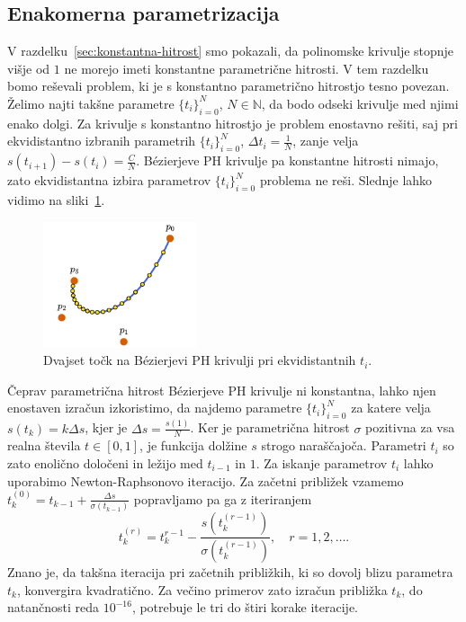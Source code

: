 \documentclass[isrm2, tisk]{fmfdelo}
\newcommand{\N}{\mathbb N}
\begin{document}
    \subsection{Enakomerna parametrizacija}
    V razdelku~\ref{sec:konstantna-hitrost} smo pokazali, da polinomske krivulje stopnje višje od $1$ ne morejo imeti konstantne parametrične hitrosti.
    V tem razdelku bomo reševali problem, ki je s konstantno parametrično hitrostjo tesno povezan.
    Želimo najti takšne parametre $\{t_i\}_{i=0}^{N}$, $N\in \N$, da bodo odseki krivulje med njimi enako dolgi.
    Za krivulje s konstantno hitrostjo je problem enostavno rešiti, saj pri ekvidistantno izbranih parametrih $\{t_i\}_{i=0}^{N}$, $\Delta t_i = \frac{1}{N}$, zanje velja $s(t_{i+1})-s(t_i) =\frac{C}{N}$.
    Bézierjeve PH krivulje pa konstantne hitrosti nimajo, zato ekvidistantna izbira parametrov $\{t_i\}_{i=0}^{N}$  problema ne reši.
    Slednje lahko vidimo na sliki~\ref{fig:enakomerni-t}.
    \begin{figure}[h]
        \centering
        \includegraphics[width = 0.40\textwidth]{images/enakomerni-t}
        \caption{Dvajset točk na Bézierjevi PH krivulji pri ekvidistantnih $t_i$.}
        \label{fig:enakomerni-t}
    \end{figure}
    Čeprav parametrična hitrost Bézierjeve PH krivulje ni konstantna, lahko njen enostaven izračun izkoristimo, da najdemo parametre $\{t_i\}^{N}_{i=0}$ za katere velja $s(t_k)=k\Delta s$, kjer je $\Delta s = \frac{s(1)}{N}$.
    Ker je parametrična hitrost $\sigma$ pozitivna za vsa realna števila $t\in[0,1]$, je funkcija dolžine $s$ strogo naraščajoča.
    Parametri $t_i$ so zato enolično določeni in ležijo med $t_{i-1}$ in $1$.
    Za iskanje parametrov $t_i$ lahko uporabimo Newton-Raphsonovo iteracijo.
    Za začetni približek vzamemo $t_k^{(0)} = t_{k-1} + \frac{\Delta s}{\sigma(t_{k-1})}$ popravljamo pa ga z iteriranjem
    \[ t_k^{(r)} = t_k^{r-1} - \frac{s(t_k^{(r-1)})}{\sigma(t_k^{(r-1)})}, \quad r=1,2,\ldots .\]
    Znano je, da takšna iteracija pri začetnih približkih, ki so dovolj blizu parametra $t_k$, konvergira kvadratično.
    Za večino primerov zato izračun približka $t_k$, do natančnosti reda $10^{-16}$, potrebuje le tri do štiri korake iteracije.
\end{document}
